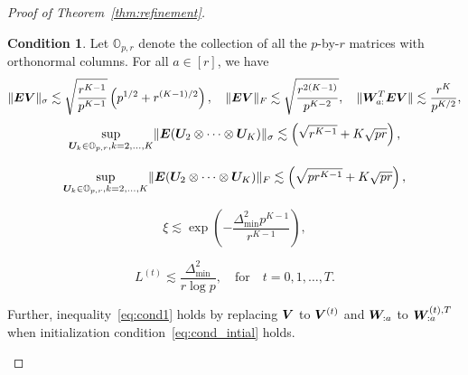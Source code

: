\documentclass[lettersize,onecolumn,journal]{IEEEtran}
\theoremstyle{definition}
\theoremstyle{definition}
\newtheorem{condition}{Condition}
\newcommand{\of}[1]{\left(#1\right)}
\def\fixme#1#2{\textbf{\color{red}[FIXME (#1): #2]}}
\begin{document}
\begin{proof}[Proof of Theorem~\ref{thm:refinement}]
\begin{condition}\label{cond:origin} Let $\mathbb{O}_{p, r}$ denote the collection of all the $p$-by-$r$ matrices with orthonormal columns. For all $a \in [r]$, we have 
\begin{equation}\label{eq:cond1}
    \onormSize{}{\mE \mV}_\sigma \lesssim \sqrt{\frac{r^{K-1}}{p^{K-1}}} \of{ p ^{1/2}+ r^{(K-1)/2}}, \quad \onormSize{}{\mE \mV}_F \lesssim \sqrt{\frac{ r^{2(K-1)}}{p^{K-2}}},\quad \onormSize{}{ \mW_{a:}^T \mE \mV} \lesssim \frac{r^K}{p^{K/2}},
\end{equation}
\begin{equation}\label{eq:cond2}
    \sup_{ \mU_k \in \mathbb{O}_{p, r}, k = 2,\ldots, K } \onormSize{}{ \mE (\mU_{2} \otimes \cdots \otimes \mU_K)}_\sigma \lesssim \of{ \sqrt{r^{K-1}} + K\sqrt{pr}},
\end{equation}

\begin{equation}\label{eq:cond3}
    \sup_{ \mU_k \in \mathbb{O}_{p, r}, k = 2,\ldots, K } \onormSize{}{ \mE (\mU_{2} \otimes \cdots \otimes \mU_K)}_F \lesssim \of{ \sqrt{pr^{K-1}} + K\sqrt{pr}},
\end{equation}

\begin{equation}\label{eq:cond_oracle}
    \xi \lesssim \exp\of{ - \frac{\Delta_{\min}^2 p^{K-1}}{r^{K-1}}},
\end{equation}



\begin{equation}\label{eq:cond_intial}
    L^{(t)} \lesssim \frac{\Delta_{\min}^2}{r \log p}, \quad \text{for} \quad t = 0, 1, \ldots, T.
\end{equation}
 
Further, inequality~\eqref{eq:cond1} holds by replacing $\bm{V}$ to $\bm{V}^{(t)}$ and $\bm{W}_{:a}$ to $\bm{W}_{:a}^{(t),T}$ when initialization condition~\eqref{eq:cond_intial} holds.
\end{condition}



\end{proof}
\end{document}
